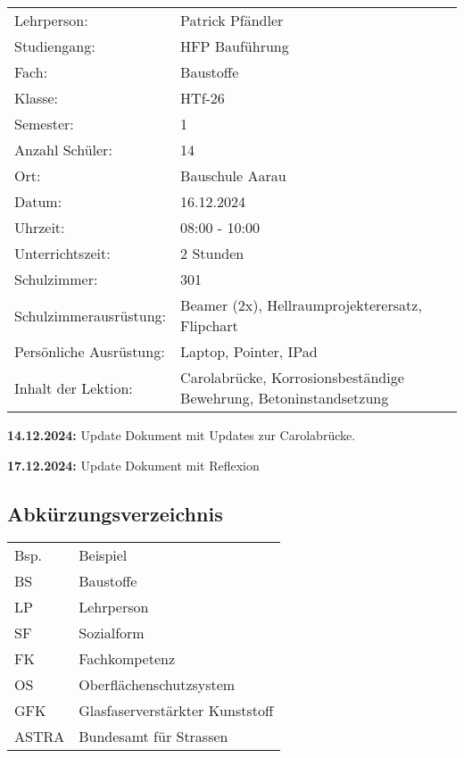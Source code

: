 \documentclass[
11pt,
captions=tableheading,
headsepline,
footsepline, 
captions=tableheading,
parskip=half-,
]{scrartcl}
\begin{document}
\begin{table}[ht]
    \centering
    \label{tab:uebersicht}
    \begin{tabularx}{\textwidth}{@{}Xp{11cm}@{}}
    \toprule
    Lehrperson: & Patrick Pfändler \\
    Studiengang: & HFP Bauführung \\
    Fach: & Baustoffe \\
    \midrule
    Klasse: & HTf-26 \\
    Semester: & 1 \\
    Anzahl Schüler: & 14 \\
    Ort: & Bauschule Aarau \\
    Datum: & 16.12.2024 \\
    Uhrzeit: & 08:00 - 10:00 \\
    Unterrichtszeit: & 2 Stunden \\
    Schulzimmer: & 301 \\
    Schulzimmerausrüstung: & Beamer (2x), Hellraumprojekterersatz, Flipchart \\
    \midrule
    Persönliche Ausrüstung: & Laptop, Pointer, IPad \\
    \midrule
    Inhalt der Lektion: & Carolabrücke, Korrosionsbeständige Bewehrung, Betoninstandsetzung \\
    \bottomrule
    \end{tabularx}
    \end{table}

    \begin{tcolorbox}[colback=blue!5!white, colframe=blue!75!black, title=CHANGELOG]
        \textbf{14.12.2024:} Update Dokument mit Updates zur Carolabrücke.

        \textbf{17.12.2024:} Update Dokument mit Reflexion
        \end{tcolorbox}


\clearpage
\vspace*{2cm}
\setcounter{tocdepth}{3} %
\tableofcontents%
\clearpage

\subsection*{Abkürzungsverzeichnis}
\begin{table}[H]
    \centering
    \label{tab:abkuerzungen}
    \begin{tabularx}{\textwidth}{@{}ll@{}}
    \toprule
    Bsp. & Beispiel \\
    BS & Baustoffe \\
    LP & Lehrperson \\
    SF & Sozialform \\
    FK & Fachkompetenz \\
    OS & Oberflächenschutzsystem \\
    GFK & Glasfaserverstärkter Kunststoff \\
    ASTRA & Bundesamt für Strassen \\
    \bottomrule
    \end{tabularx}
    \end{table}
\end{document}
